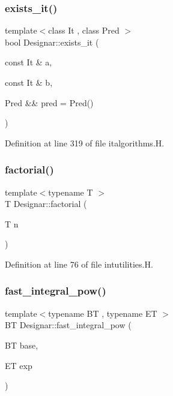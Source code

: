\subsubsection{\texorpdfstring{exists\+\_\+it()}{exists\_it()}\hspace{0.1cm}{\footnotesize\ttfamily [2/2]}}
{\footnotesize\ttfamily template$<$class It , class Pred $>$ \\
bool Designar\+::exists\+\_\+it (\begin{DoxyParamCaption}\item[{const It \&}]{a,  }\item[{const It \&}]{b,  }\item[{Pred \&\&}]{pred = {\ttfamily Pred()} }\end{DoxyParamCaption})}



Definition at line 319 of file italgorithms.\+H.

\mbox{\label{namespace_designar_a7760d03bc384dbf96c672da4848b4910}} 
\subsubsection{\texorpdfstring{factorial()}{factorial()}}
{\footnotesize\ttfamily template$<$typename T $>$ \\
T Designar\+::factorial (\begin{DoxyParamCaption}\item[{T}]{n }\end{DoxyParamCaption})}



Definition at line 76 of file intutilities.\+H.

\mbox{\label{namespace_designar_a28b07c64f84f9fd04d1daa7f6e083aa2}} 
\subsubsection{\texorpdfstring{fast\+\_\+integral\+\_\+pow()}{fast\_integral\_pow()}}
{\footnotesize\ttfamily template$<$typename BT , typename ET $>$ \\
BT Designar\+::fast\+\_\+integral\+\_\+pow (\begin{DoxyParamCaption}\item[{BT}]{base,  }\item[{ET}]{exp }\end{DoxyParamCaption})}



